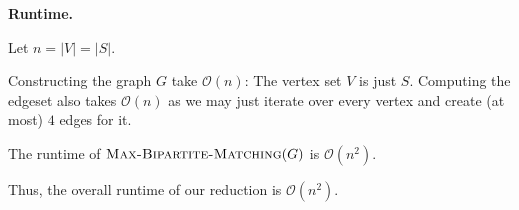 \documentclass[11pt]{article}
\begin{document}
{\textbf{Runtime.}

Let $n = |V| = |S|$.

Constructing the graph $G$ take $\mathcal{O}(n)$: The vertex set $V$ is just $S$. Computing the edgeset also takes $\mathcal{O}(n)$ as we may just iterate over every vertex and create (at most) $4$ edges for it.

The runtime of $\textsc{Max-Bipartite-Matching}(G)$ is $\mathcal{O}(n^2)$. 

Thus, the overall runtime of our reduction is $\mathcal{O}(n^2)$.
}
\end{document}
